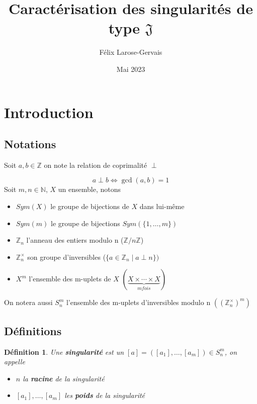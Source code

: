 \documentclass{article}
\title{Caractérisation des singularités de type $\mathfrak{J}$}
\author{Félix Larose-Gervais}
\date{Mai 2023}
\newtheorem{definition}{Définition}
\begin{document}
\maketitle

\tableofcontents

\newpage

\section{Introduction}

\subsection{Notations}

Soit $a, b \in \mathbb{Z}$ on note la relation de coprimalité $\perp$

\[ a \perp b \iff \gcd(a, b) = 1 \]
Soit $m, n \in \mathbb{N}$, $X$ un ensemble, notons 

\begin{itemize}
    \item $Sym(X)$ le groupe de bijections de $X$ dans lui-même
    \item $Sym(m)$ le groupe de bijections $Sym(\{1, \dots, m \})$ 
    \item $\mathbb{Z}_n$ l'anneau des entiers modulo n ($\mathbb{Z}/n\mathbb{Z}$)
    \item $\mathbb{Z}_n^\times$ son groupe d'inversibles ($\{ a \in \mathbb{Z}_n \mid a \perp n \})$
    \item $X^m$ l'ensemble des m-uplets de $X$ $(\underbrace{X \times \cdots \times X}_{m fois})$
\end{itemize}
On notera aussi $S_n^m$ l'ensemble des m-uplets d'inversibles modulo n $({({\mathbb{Z}_n^\times})}^m)$

\subsection{Définitions}

\begin{definition}
    Une \textbf{singularité} est un $[a] = ([a_1], \dots, [a_m]) \in S_n^m$, on appelle \begin{itemize}
        \item $n$ la \textbf{racine} de la singularité
        \item $[a_1], \dots, [a_m]$ les \textbf{poids} de la singularité
    \end{itemize}
\end{definition}
\end{document}
